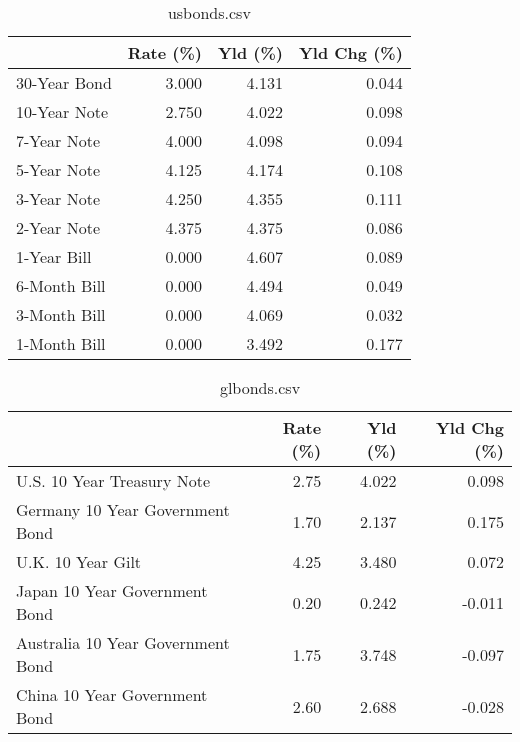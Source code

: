 \documentclass{article}%
\begin{document}
%


\begin{table}[htbp]%
\caption{usbonds.csv}%
\centering%
\begin{adjustbox}{width=1\textwidth}%
\begin{tabular}{lrrr}
\toprule
             &  Rate (\%) &  Yld (\%) &  Yld Chg (\%) \\
\midrule
30-Year Bond &     3.000 &    4.131 &        0.044 \\
10-Year Note &     2.750 &    4.022 &        0.098 \\
 7-Year Note &     4.000 &    4.098 &        0.094 \\
 5-Year Note &     4.125 &    4.174 &        0.108 \\
 3-Year Note &     4.250 &    4.355 &        0.111 \\
 2-Year Note &     4.375 &    4.375 &        0.086 \\
 1-Year Bill &     0.000 &    4.607 &        0.089 \\
6-Month Bill &     0.000 &    4.494 &        0.049 \\
3-Month Bill &     0.000 &    4.069 &        0.032 \\
1-Month Bill &     0.000 &    3.492 &        0.177 \\
\bottomrule
\end{tabular}
%
\end{adjustbox}%
\end{table}

%


\begin{table}[htbp]%
\caption{glbonds.csv}%
\centering%
\begin{adjustbox}{width=1\textwidth}%
\begin{tabular}{lrrr}
\toprule
                                  &  Rate (\%) &  Yld (\%) &  Yld Chg (\%) \\
\midrule
       U.S. 10 Year Treasury Note &      2.75 &    4.022 &        0.098 \\
  Germany 10 Year Government Bond &      1.70 &    2.137 &        0.175 \\
                U.K. 10 Year Gilt &      4.25 &    3.480 &        0.072 \\
    Japan 10 Year Government Bond &      0.20 &    0.242 &       -0.011 \\
Australia 10 Year Government Bond &      1.75 &    3.748 &       -0.097 \\
    China 10 Year Government Bond &      2.60 &    2.688 &       -0.028 \\
\bottomrule
\end{tabular}
%
\end{adjustbox}%
\end{table}
\end{document}
